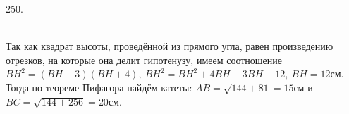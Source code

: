 250. \begin{figure}[ht!]
\end{figure}\\
Так как квадрат высоты, проведённой из прямого угла, равен произведению отрезков, на которые она делит гипотенузу, имеем соотношение $BH^2=(BH-3)(BH+4),\ BH^2=BH^2+4BH-3BH-12,\ BH=12$см. Тогда по теореме Пифагора найдём катеты:
$AB=\sqrt{144+81}=15$см и $BC=\sqrt{144+256}=20$см.\newpage\noindent
